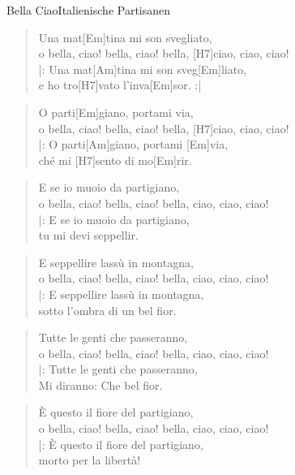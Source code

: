 \begin{song}{Bella Ciao}{Italienische Partisanen}

    \begin{verse}  
        Una mat[Em]tina mi son svegliato, \\
        o bella, ciao! bella, ciao! bella, [H7]ciao, ciao, ciao! \\
        |: Una mat[Am]tina mi son sveg[Em]liato, \\
        e ho tro[H7]vato l’inva[Em]sor. :| 
    \end{verse}  

    \begin{verse}
        O parti[Em]giano, portami via, \\
        o bella, ciao! bella, ciao! bella, [H7]ciao, ciao, ciao! \\
        |: O parti[Am]giano, portami [Em]via, \\
        ché mi [H7]sento di mo[Em]rir. 
    \end{verse}

    \begin{verse}  
        E se io muoio da partigiano, \\
        o bella, ciao! bella, ciao! bella, ciao, ciao, ciao! \\
        |: E se io muoio da partigiano, \\
        tu mi devi seppellir. 
    \end{verse}  

    \begin{verse}  
        E seppellire lassù in montagna, \\
        o bella, ciao! bella, ciao! bella, ciao, ciao, ciao! \\
        |: E seppellire lassù in montagna, \\
        sotto l’ombra di un bel fior. 
    \end{verse}  

    \begin{verse}  
        Tutte le genti che passeranno, \\
        o bella, ciao! bella, ciao! bella, ciao, ciao, ciao! \\
        |: Tutte le genti che passeranno, \\
        Mi diranno: Che bel fior.
    \end{verse}  

    \begin{verse}  
        È questo il fiore del partigiano, \\
        o bella, ciao! bella, ciao! bella, ciao, ciao, ciao! \\
        |: È questo il fiore del partigiano, \\
        morto per la libertà! 
    \end{verse}  

\end{song}
